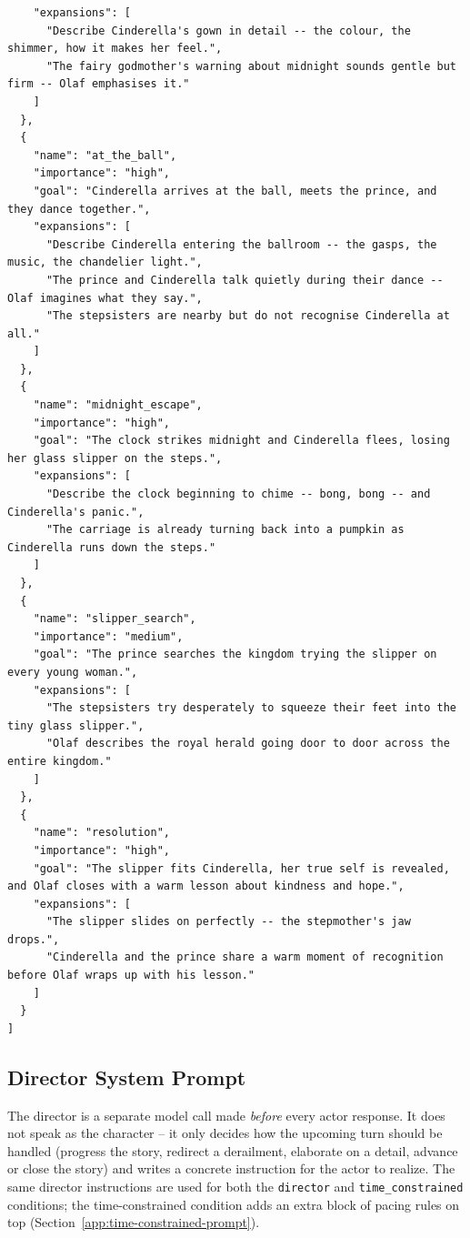 \documentclass[10pt]{article}
\begin{document}
\begin{lstlisting}
    "expansions": [
      "Describe Cinderella's gown in detail -- the colour, the shimmer, how it makes her feel.",
      "The fairy godmother's warning about midnight sounds gentle but firm -- Olaf emphasises it."
    ]
  },
  {
    "name": "at_the_ball",
    "importance": "high",
    "goal": "Cinderella arrives at the ball, meets the prince, and they dance together.",
    "expansions": [
      "Describe Cinderella entering the ballroom -- the gasps, the music, the chandelier light.",
      "The prince and Cinderella talk quietly during their dance -- Olaf imagines what they say.",
      "The stepsisters are nearby but do not recognise Cinderella at all."
    ]
  },
  {
    "name": "midnight_escape",
    "importance": "high",
    "goal": "The clock strikes midnight and Cinderella flees, losing her glass slipper on the steps.",
    "expansions": [
      "Describe the clock beginning to chime -- bong, bong -- and Cinderella's panic.",
      "The carriage is already turning back into a pumpkin as Cinderella runs down the steps."
    ]
  },
  {
    "name": "slipper_search",
    "importance": "medium",
    "goal": "The prince searches the kingdom trying the slipper on every young woman.",
    "expansions": [
      "The stepsisters try desperately to squeeze their feet into the tiny glass slipper.",
      "Olaf describes the royal herald going door to door across the entire kingdom."
    ]
  },
  {
    "name": "resolution",
    "importance": "high",
    "goal": "The slipper fits Cinderella, her true self is revealed, and Olaf closes with a warm lesson about kindness and hope.",
    "expansions": [
      "The slipper slides on perfectly -- the stepmother's jaw drops.",
      "Cinderella and the prince share a warm moment of recognition before Olaf wraps up with his lesson."
    ]
  }
]
\end{lstlisting}

\subsection{Director System Prompt}
\label{app:director-prompt}

The director is a separate model call made \emph{before} every actor
response. It does not speak as the character -- it only decides how the
upcoming turn should be handled (progress the story, redirect a derailment,
elaborate on a detail, advance or close the story) and writes a concrete
instruction for the actor to realize. The same director instructions are
used for both the \texttt{director} and \texttt{time\_constrained}
conditions; the time-constrained condition adds an extra block of pacing
rules on top (Section~\ref{app:time-constrained-prompt}).
\end{document}
